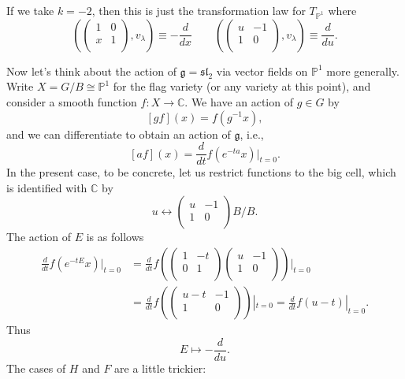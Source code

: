\documentclass[12pt]{article}
\theoremstyle{plain}
\theoremstyle{definition}
\numberwithin{equation}{section}
\newcommand{\la}{\lambda}
\newcommand{\C}{\mathbb{C}}
\newcommand{\bbP}{\mathbb{P}}
\newcommand{\g}{\mathfrak{g}}
\newcommand{\sll}{\mathfrak{sl}}
\begin{document}
If we take $k = -2$, then this is just the transformation law for $T_{\bbP^1}$ where
\[(\left(
\begin{array}{cc}
1 & 0 \\
x & 1 \\
\end{array}
\right), v_\la) \equiv -\frac{d}{dx} \qquad (\left(
\begin{array}{cc}
u & -1 \\
1 & 0 \\
\end{array}
\right), v_\la) \equiv \frac{d}{du}.
\]

Now let's think about the action of $\g = \sll_2$ via vector fields on $\bbP^1$ more generally. Write $X = G/B \cong \bbP^1$ for the flag variety (or any variety at this point), and consider a smooth function $f : X \rightarrow \C$. We have an action of $g \in G$ by
\[
[g f](x) = f(g^{-1}x),
\]
and we can differentiate to obtain an action of $\g$, i.e.,
\[
[a f](x) = \frac{d}{dt} f(e^{-ta} x) |_{t=0}.
\]
In the present case, to be concrete, let us restrict functions to the big cell, which is identified with $\C$ by
\[
u \leftrightarrow \left(
\begin{array}{cc}
u & -1 \\
1 & 0 \\
\end{array}
\right) B / B.
\]
The action of $E$ is as follows
\begin{align*}
\frac{d}{dt} f(e^{-tE} x) |_{t=0} &= \frac{d}{dt} f( \left(
\begin{array}{cc}
1 & -t \\
0 & 1 \\
\end{array}
\right)\left(
\begin{array}{cc}
u & -1 \\
1 & 0 \\
\end{array}
\right) )|_{t=0} \\
%
&= \frac{d}{dt} f( \left(
\begin{array}{cc}
u-t & -1 \\
1 & 0 \\
\end{array}
\right) )|_{t=0} = \frac{d}{dt} f(u-t) |_{t=0}.
\end{align*}
Thus
\[
E \mapsto -\frac{d}{du}.
\]
The cases of $H$ and $F$ are a little trickier:
\end{document}
